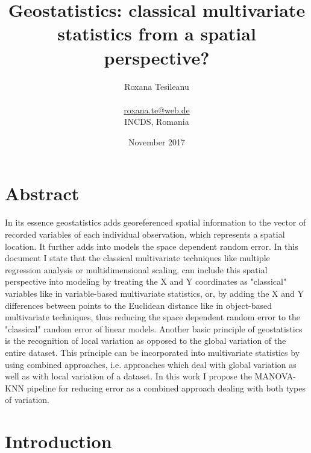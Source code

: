 \documentclass {article}
\title {Geostatistics: classical multivariate statistics from a spatial perspective?}
\date {November 2017}
\author {Roxana Tesileanu \\
\\
\href{mailto: roxana.te@web.de}{roxana.te@web.de} \\
INCDS, Romania}
\begin{document}
        \maketitle

\tableofcontents


\section* {Abstract}

In its essence geostatistics adds georeferenced spatial information to the vector of recorded variables of each individual observation, which represents a spatial location.
 It further adds into models the space dependent random error. 
In this document I state that the classical multivariate techniques like multiple regression analysis or multidimensional scaling, can include this spatial perspective into modeling by treating the X and Y coordinates as "classical" variables like in variable-based multivariate statistics, or, by adding the X and Y differences between points to the Euclidean distance like in object-based multivariate techniques, thus reducing the space dependent random error to the "classical" random error of linear models.   
Another basic principle of geostatistics is the recognition of local variation as opposed to the global variation of the entire dataset. 
This principle can be incorporated into multivariate statistics by using combined approaches, i.e. approaches which deal with global variation as well as with local variation of a dataset.
In this work I propose the MANOVA-KNN pipeline for reducing error as a combined approach dealing with both types of variation.

\section {Introduction}
\end{document}
